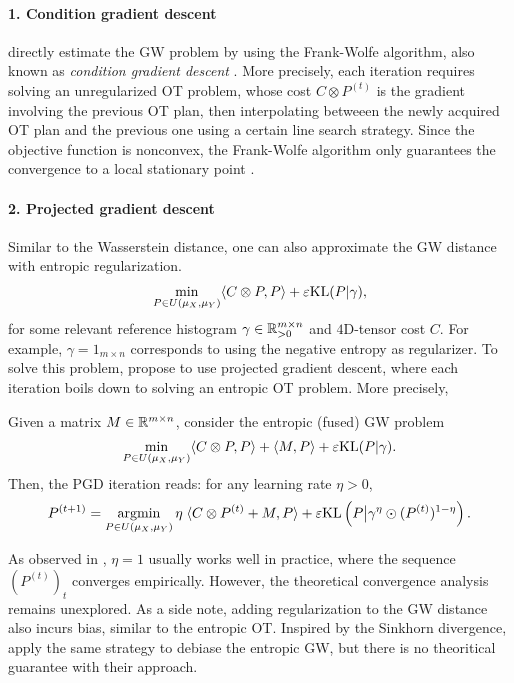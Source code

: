 \paragraph{1. Condition gradient descent} \citep{Vayer19b} directly estimate the GW problem by using
the Frank-Wolfe algorithm, also known as \textit{condition gradient descent}
\citep{Frank56,Jaggi13}. More precisely, each iteration requires
solving an unregularized OT problem, whose cost $C \otimes P^{(t)}$ is the gradient
involving the previous OT plan, then interpolating betweeen the newly acquired OT plan and
the previous one using a certain line search strategy. Since the objective function is nonconvex,
the Frank-Wolfe algorithm only guarantees the convergence to a local stationary point \citep{Julien16}.

\paragraph{2. Projected gradient descent} Similar to the Wasserstein distance,
one can also approximate the GW distance with entropic regularization.
\begin{align}
  \min_{\substack{P \in U(\mu_X, \mu_Y)}} \langle C \otimes P, P \rangle + \varepsilon \text{KL}(P | \gamma),
\end{align}
for some relevant reference histogram $\gamma \in \mathbb R^{m \times n}_{> 0}$ and $4$D-tensor cost $C$.
For example, $\gamma = 1_{m \times n}$ corresponds to using the negative entropy as regularizer.
To solve this problem, \citep{Peyre16,Solomon16} propose to use projected gradient descent,
where each iteration boils down to solving an entropic OT problem. More precisely,
\begin{lemma}
  \label{lemma:fgw_pgd}
  Given a matrix $M \in \mathbb R^{m \times n}$, consider the entropic (fused) GW problem
  \begin{align}
    \label{eq:fused_egw}
    \min_{\substack{P \in U(\mu_X, \mu_Y)}} \langle C \otimes P, P \rangle
    + \langle M, P \rangle + \varepsilon \text{KL}(P | \gamma).
  \end{align}
  Then, the PGD iteration reads: for any learning rate $\eta > 0$,
  \begin{align}
    P^{(t+1)} = \operatorname*{argmin}_{P \in U(\mu_X, \mu_Y)}
    \eta \; \langle C \otimes P^{(t)} + M, P \rangle
    + \varepsilon \text{KL} \left( P \big| \gamma^{\eta} \odot (P^{(t)})^{1 - \eta} \right).
  \end{align}
\end{lemma}
As observed in \citep{Peyre19}, $\eta = 1$ usually works well in practice,
where the sequence $(P^{(t)})_t$ converges empirically. However, the theoretical
convergence analysis remains unexplored. As a side note,
adding regularization to the GW distance also incurs bias,
similar to the entropic OT. Inspired by the Sinkhorn divergence,
\citep{Bunne19} apply the same strategy to debiase the entropic GW,
but there is no theoritical guarantee with their approach.

